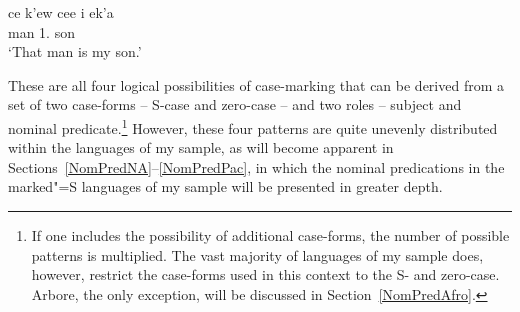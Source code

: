 \begin{exe}\ex \label{Wappo}
\gll ce k'ew ce{\textglotstop}e{\textglotstop} i ek'a\\
     \dem{} man \cop{} 1.\sg{} son\\
	\glt	`That man is my son.'
\end{exe}                                                                                                  

These are all four logical possibilities of case-marking that can be derived from a set of two case-forms -- S-case and zero-case -- and two roles -- subject and nominal predicate.\footnote{If one includes the possibility of additional case-forms, the number of possible patterns is multiplied. 
The vast majority  of languages of my sample does, however, restrict the case-forms used in this context to the S- and zero-case. 
Arbore, the only exception, will be discussed in Section~\ref{NomPredAfro}.}
However, these four patterns are quite unevenly distributed within the languages of my sample, as will become apparent in Sections~\ref{NomPredNA}--\ref{NomPredPac}, in which the nominal predications in the marked"=S languages of my sample will be presented in greater depth.

